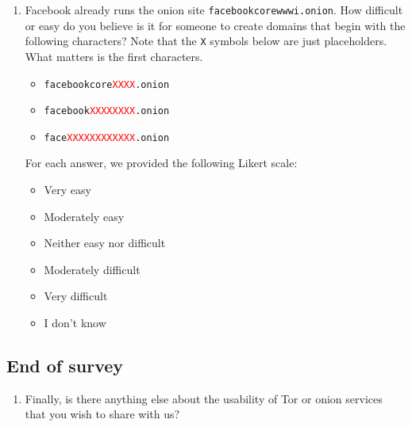 \begin{enumerate}
    \item Facebook already runs the onion site \texttt{facebookcorewwwi.onion}.
        How difficult or easy do you believe is it for someone to create domains
        that begin with the following characters? Note that the {\color{red}
        \texttt{X}} symbols below
        are just placeholders. What matters is the first characters.
        \begin{itemize}
            \item \texttt{facebookcore\textcolor{red}{XXXX}.onion}
            \item \texttt{facebook\textcolor{red}{XXXXXXXX}.onion}
            \item \texttt{face\textcolor{red}{XXXXXXXXXXXX}.onion}
        \end{itemize}
        For each answer, we provided the following Likert scale:
        \begin{itemize}
            \item Very easy
            \item Moderately easy
            \item Neither easy nor difficult
            \item Moderately difficult
            \item Very difficult
            \item I don't know
        \end{itemize}
\end{enumerate}

\subsection{End of survey}
\begin{enumerate}
    \item Finally, is there anything else about the usability of Tor or onion
        services that you wish to share with us?
\end{enumerate}
